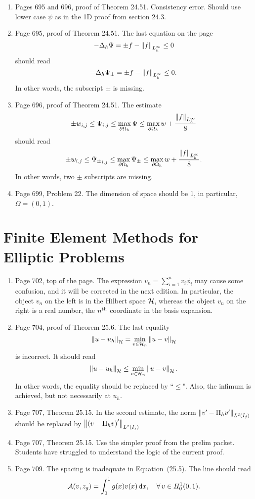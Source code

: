 \documentclass{book}
\begin{document}
\begin{enumerate}
	
	
	\item
Pages 695 and 696, proof of Theorem 24.51. Consistency error. Should use lower case $\psi$ as in the 1D proof from section 24.3.

	\item
Page 695, proof of Theorem 24.51. The last equation on the page 
	\[
-\Delta_h \Psi = \pm f - \left\| f \right\|_{L_h^\infty} \le 0	
	\]
should read
	\[
-\Delta_h \Psi_{\pm} = \pm f - \left\| f \right\|_{L_h^\infty} \le 0.	
	\]
In other words, the subscript $\pm$ is missing.
	
	\item
Page 696, proof of Theorem 24.51. The estimate 
	\[
\pm w_{i,j} \le \Psi_{i,j} \le \max_{\partial\Omega_h} \Psi \le \max_{\partial\Omega_h} w + \frac{\left\| f \right\|_{L_h^\infty}}{8}
	\]
should read
	\[
\pm w_{i,j} \le {\Psi_{\pm}}_{i,j} \le \max_{\partial\Omega_h} \Psi_{\pm} \le \max_{\partial\Omega_h} w + \frac{\left\| f \right\|_{L_h^\infty}}{8}.
	\]
In other words, two $\pm$ subscripts are missing.
 
	\item
Page 699, Problem 22. The dimension of space should be 1, in particular, $\Omega = (0,1)$.

	\end{enumerate}
	
\chapter{Finite Element Methods for Elliptic Problems}

	\begin{enumerate}
	
	\item
Page 702, top of the page. The expression $v_n = \sum_{i=1}^n v_i \phi_i$ may cause some confusion, and it will be corrected in the next edition. In particular, the object $v_n$ on the left is in the Hilbert space ${\mathcal H}$, whereas the object $v_n$ on the right is a real number, the $n^{\rm th}$ coordinate in the basis expansion.

	\item
Page 704, proof of Theorem 25.6.  The last equality 
	\[
\left\| u-u_h \right\|_{{\mathcal H}} = \min_{v\in {\mathcal H}_n} \left\| u-v \right\|_{{\mathcal H}}
	\]
is incorrect. It should read
	\[
\left\| u-u_h \right\|_{{\mathcal H}} \le  \min_{v\in {\mathcal H}_n} \left\| u-v \right\|_{{\mathcal H}} .
	\]
In other words, the equality should be replaced by ``$\le$". Also, the infimum is achieved, but not necessarily at $u_h$.
	
	\item
Page 707, Theorem 25.15. In the second estimate, the norm $\left\| v'-\Pi_h v' \right\|_{L^2(I_j)}$ should be replaced by $\left\| \left(v-\Pi_h v \right)' \right\|_{L^2(I_j)}$
	
	\item
Page 707, Theorem 25.15. Use the simpler proof from the prelim packet. Students have struggled to understand the logic of the current proof.
	\item
Page 709. The spacing is inadequate in Equation~(25.5). The line should read
	\[
\mathcal{A}(v,z_g) = \int_0^1 g(x) v(x)\, \textup{d} x, \quad \forall \, v\in H_0^1(0,1).
	\]
	\end{enumerate}
	
\end{document}
